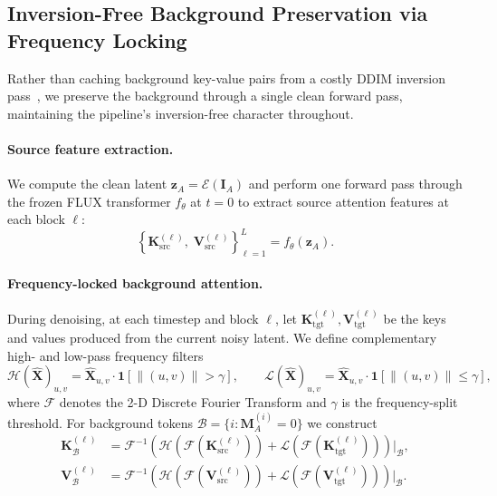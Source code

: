 \subsection{Inversion-Free Background Preservation via Frequency Locking}

Rather than caching background key-value pairs from a costly DDIM inversion
pass~\cite{zhu2025kvedit}, we preserve the background through a single clean forward pass,
maintaining the pipeline's inversion-free character throughout.

\paragraph{Source feature extraction.}
We compute the clean latent $\mathbf{z}_A = \mathcal{E}(\mathbf{I}_A)$ and perform one forward
pass through the frozen FLUX transformer $f_\theta$ at $t=0$ to extract source attention
features at each block $\ell$:
\begin{equation}
    \left\{\mathbf{K}_{\text{src}}^{(\ell)},\;
           \mathbf{V}_{\text{src}}^{(\ell)}\right\}_{\ell=1}^{L}
    = f_\theta(\mathbf{z}_A).
    \label{eq:src_features}
\end{equation}

\paragraph{Frequency-locked background attention.}
During denoising, at each timestep and block $\ell$, let
$\mathbf{K}_{\text{tgt}}^{(\ell)}, \mathbf{V}_{\text{tgt}}^{(\ell)}$
be the keys and values produced from the current noisy latent.
We define complementary high- and low-pass frequency filters
\begin{equation}
    \mathcal{H}(\hat{\mathbf{X}})_{u,v} =
        \hat{\mathbf{X}}_{u,v}\cdot\mathbf{1}\!\left[\|(u,v)\| > \gamma\right],
    \qquad
    \mathcal{L}(\hat{\mathbf{X}})_{u,v} =
        \hat{\mathbf{X}}_{u,v}\cdot\mathbf{1}\!\left[\|(u,v)\| \leq \gamma\right],
    \label{eq:filters}
\end{equation}
where $\mathcal{F}$ denotes the 2-D Discrete Fourier Transform and $\gamma$ is the
frequency-split threshold.
For background tokens $\mathcal{B} = \{i : \mathbf{M}_A^{(i)} = 0\}$ we construct
\begin{align}
    \mathbf{K}_{\mathcal{B}}^{(\ell)}
        &= \mathcal{F}^{-1}\!\left(
              \mathcal{H}\!\left(\mathcal{F}\!\left(\mathbf{K}_{\text{src}}^{(\ell)}\right)\right)
            + \mathcal{L}\!\left(\mathcal{F}\!\left(\mathbf{K}_{\text{tgt}}^{(\ell)}\right)\right)
           \right)\!\bigg|_{\mathcal{B}},
    \label{eq:bg_K} \\
    \mathbf{V}_{\mathcal{B}}^{(\ell)}
        &= \mathcal{F}^{-1}\!\left(
              \mathcal{H}\!\left(\mathcal{F}\!\left(\mathbf{V}_{\text{src}}^{(\ell)}\right)\right)
            + \mathcal{L}\!\left(\mathcal{F}\!\left(\mathbf{V}_{\text{tgt}}^{(\ell)}\right)\right)
           \right)\!\bigg|_{\mathcal{B}}.
    \label{eq:bg_V}
\end{align}

